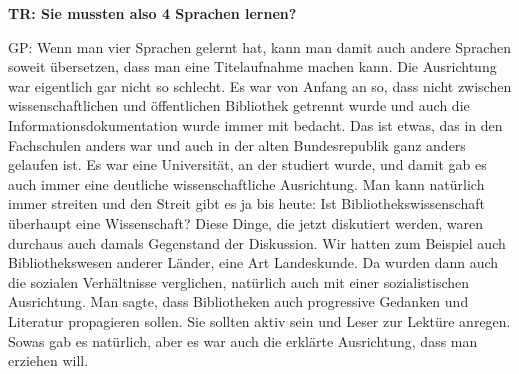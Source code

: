 \documentclass[a4paper,
fontsize=11pt,
oneside,
numbers=noperiodatend,
parskip=half-,
bibliography=totoc,
final
]{scrartcl}
\begin{document}
\textbf{TR: Sie mussten also 4 Sprachen lernen?\\
}

GP: Wenn man vier Sprachen gelernt hat, kann man damit auch andere
Sprachen soweit übersetzen, dass man eine Titelaufnahme machen kann. Die
Ausrichtung war eigentlich gar nicht so schlecht. Es war von Anfang an
so, dass nicht zwischen wissenschaftlichen und öffentlichen Bibliothek
getrennt wurde und auch die Informationsdokumentation wurde immer mit
bedacht. Das ist etwas, das in den Fachschulen anders war und auch in
der alten Bundesrepublik ganz anders gelaufen ist. Es war eine
Universität, an der studiert wurde, und damit gab es auch immer eine
deutliche wissenschaftliche Ausrichtung. Man kann natürlich immer
streiten und den Streit gibt es ja bis heute: Ist
Bibliothekswissenschaft überhaupt eine Wissenschaft? Diese Dinge, die
jetzt diskutiert werden, waren durchaus auch damals Gegenstand der
Diskussion. Wir hatten zum Beispiel auch Bibliothekswesen anderer
Länder, eine Art Landeskunde. Da wurden dann auch die sozialen
Verhältnisse verglichen, natürlich auch mit einer sozialistischen
Ausrichtung. Man sagte, dass Bibliotheken auch progressive Gedanken und
Literatur propagieren sollen. Sie sollten aktiv sein und Leser zur
Lektüre anregen. Sowas gab es natürlich, aber es war auch die erklärte
Ausrichtung, dass man erziehen will.
\end{document}
